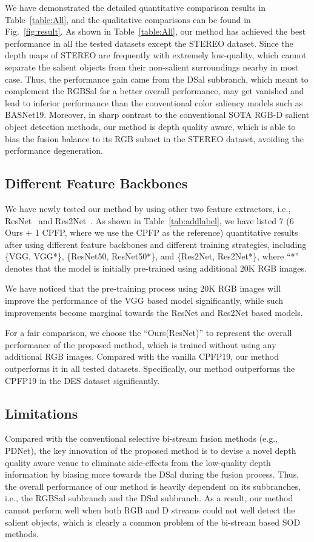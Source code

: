 \documentclass[journal]{IEEEtran}
\begin{document}
We have demonstrated the detailed quantitative comparison results in Table~\ref{table:All}, and the qualitative comparisons can be found in Fig.~\ref{fig:result}.
As shown in Table~\ref{table:All}, our method has achieved the best performance in all the tested datasets except the STEREO dataset.
Since the depth maps of STEREO are frequently with extremely low-quality, which cannot separate the salient objects from their non-salient surroundings nearby in most case. Thus, the performance gain came from the DSal subbranch, which meant to complement the RGBSal for a better overall performance, may get vanished and lead to inferior performance than the conventional color saliency models such as BASNet19.
Moreover, in sharp contrast to the conventional SOTA RGB-D salient object detection methods, our method is depth quality aware, which is able to bias the fusion balance to its RGB subnet in the STEREO dataset, avoiding the performance degeneration.

\subsection{Different Feature Backbones}
We have newly tested our method by using other two feature extractors, i.e., ResNet~\cite{he2016deep} and Res2Net~\cite{gao2019res2net}.
As shown in Table~\ref{tab:addlabel}, we have listed 7 (6 Ours + 1 CPFP, where we use the CPFP as the reference) quantitative results after using different feature backbones and different training strategies, including \{VGG, VGG*\}, \{ResNet50, ResNet50*\}, and \{Res2Net, Res2Net*\}, where ``*'' denotes that the model is initially pre-trained using additional 20K RGB images.

We have noticed that the pre-training process using 20K RGB images will improve the performance of the VGG based model significantly, while such improvements become marginal towards the ResNet and Res2Net based models.

For a fair comparison, we choose the ``Ours(ResNet)'' to represent the overall performance of the proposed method, which is trained without using any additional RGB images.
Compared with the vanilla CPFP19, our method outperforms it in all tested datasets.
Specifically, our method outperforms the CPFP19 in the DES dataset significantly.

\subsection{Limitations}
Compared with the conventional selective bi-stream fusion methods (e.g., PDNet), the key innovation of the proposed method is to devise a novel depth quality aware venue to eliminate side-effects from the low-quality depth information by biasing more towards the DSal during the fusion process.
Thus, the overall performance of our method is heavily dependent on its subbranches, i.e., the RGBSal subbranch and the DSal subbranch.
As a result, our method cannot perform well when both RGB and D streams could not well detect the salient objects, which is clearly a common problem of the bi-stream based SOD methods.
\end{document}
